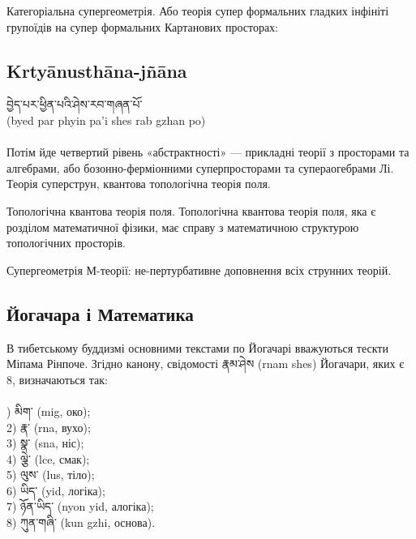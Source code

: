 Категоріальна супергеометрія. Або теорія супер формальних гладких інфініті групоїдів на
супер формальних Картанових просторах:

\subsection*{Krtyānusthāna-jñāna}

\ti བྱེད་པར་ཕྱིན་པའི་ཤེས་རབ་གཞན་པོ་ 
\\
\ua (byed par phyin pa'i shes rab gzhan po)\\
\\
Потім йде четвертий рівень «абстрактності» — прикладні теорії з просторами та алгебрами, або бозонно-ферміонними суперпросторами та супераогебрами Лі. Теорія суперструн, квантова топологічна теорія поля.

Топологічна квантова теорія поля. Топологічна квантова теорія поля, яка є розділом математичної фізики, має справу з математичною структурою топологічних просторів.

Супергеометрія М-теорії: не-пертурбативне доповнення всіх струнних теорій.

\subsection*{Йогачара і Математика}

В тибетському буддизмі основними текстами по Йогачарі вважуються тескти Міпама Рінпоче.
Згідно канону, свідомості \ti རྣམ་ཤེས  \ua (rnam shes) Йогачари, яких є 8, визначаються так:
\\
\\
\footnotesize
{}) \ti མིག་ \ua (mig, око);\\
2) \ti རྣ་ \ua (rna, вухо);\\
3) \ti སྣ་ \ua (sna, ніс);\\
4) \ti ལྕེ་ \ua (lce, смак);\\
5) \ti ལུས་ \ua (lus, тіло);\\
6) \ti ཡིད་ \ua (yid, логіка);\\
7) \ti ཉོན་ཡིད་  \ua (nyon yid, алогіка);\\
8) \ti ཀུན་གཞི་  \ua (kun gzhi, основа).\\
\normalsize

